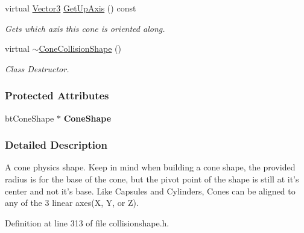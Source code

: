 \begin{DoxyCompactItemize}
\item 
virtual \hyperlink{classphys_1_1Vector3}{Vector3} \hyperlink{classphys_1_1ConeCollisionShape_a1d391d17d1a7ba4e156fe24717175898}{GetUpAxis} () const 
\begin{DoxyCompactList}\small\item\em Gets which axis this cone is oriented along. \item\end{DoxyCompactList}\item 
\hypertarget{classphys_1_1ConeCollisionShape_ae0516f6da6334790c2052ae926a7739b}{
virtual \hyperlink{classphys_1_1ConeCollisionShape_ae0516f6da6334790c2052ae926a7739b}{$\sim$ConeCollisionShape} ()}
\label{classphys_1_1ConeCollisionShape_ae0516f6da6334790c2052ae926a7739b}

\begin{DoxyCompactList}\small\item\em Class Destructor. \item\end{DoxyCompactList}\end{DoxyCompactItemize}
\subsubsection*{Protected Attributes}
\begin{DoxyCompactItemize}
\item 
\hypertarget{classphys_1_1ConeCollisionShape_aa1c4ebb55fee225796012e51425d06ef}{
btConeShape $\ast$ {\bfseries ConeShape}}
\label{classphys_1_1ConeCollisionShape_aa1c4ebb55fee225796012e51425d06ef}

\end{DoxyCompactItemize}


\subsubsection{Detailed Description}
A cone physics shape. Keep in mind when building a cone shape, the provided radius is for the base of the cone, but the pivot point of the shape is still at it's center and not it's base. Like Capsules and Cylinders, Cones can be aligned to any of the 3 linear axes(X, Y, or Z). 

Definition at line 313 of file collisionshape.h.



